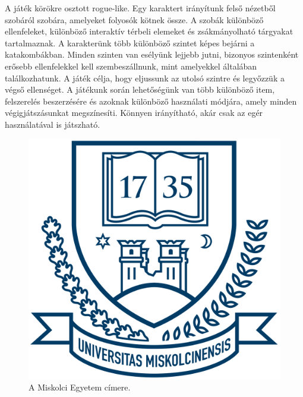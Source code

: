 
A játék körökre osztott rogue-like. Egy karaktert irányítunk felső nézetből szobáról szobára, amelyeket folyosók kötnek össze. A szobák különböző ellenfeleket, különböző interaktív térbeli elemeket és zsákmányolható tárgyakat tartalmaznak. A karakterünk több különböző szintet képes bejárni a katakombákban. Minden szinten van esélyünk lejjebb jutni, bizonyos szintenként erősebb ellenfelekkel kell szembeszállnunk, mint amelyekkel általában találkozhatunk. A játék célja, hogy eljussunk az utolsó szintre és legyőzzük a végső ellenséget. A játékunk során lehetőségünk van több különböző item, felszerelés beszerzésére és azoknak különböző használati módjára, amely minden végigjátszásunkat megszínesíti. Könnyen irányítható, akár csak az egér használatával is játszható.

\begin{figure}[h]
	\centering
	\includegraphics[scale=0.3]{images/me_logo.png}
	\caption{A Miskolci Egyetem címere.}
	\label{fig:cimer}
\end{figure}
